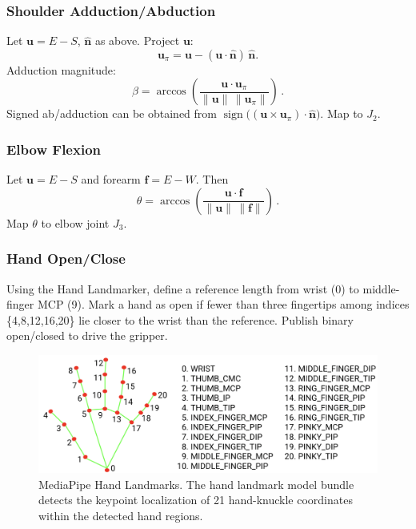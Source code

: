 \documentclass[sigconf]{acmart}
\begin{document}
\subsubsection{Shoulder Adduction/Abduction}
Let $\mathbf{u}=E-S$, $\hat{\mathbf{n}}$ as above. Project $\mathbf{u}$:
\begin{displaymath}
\mathbf{u}_\pi=\mathbf{u}-(\mathbf{u}\cdot\hat{\mathbf{n}})\,\hat{\mathbf{n}}.
\end{displaymath}
Adduction magnitude:
\begin{equation}
\beta=\arccos \!\left( \frac{\mathbf{u}\cdot\mathbf{u}_\pi}{\lVert\mathbf{u}\rVert\, \lVert\mathbf{u}_\pi\rVert} \right)\,.
\end{equation}
Signed ab/adduction can be obtained from $\operatorname{sign}\big((\mathbf{u}\times\mathbf{u}_\pi)\cdot\hat{\mathbf{n}}\big)$. Map to $J_2$.

\subsubsection{Elbow Flexion}
Let $\mathbf{u}=E-S$ and forearm $\mathbf{f}=E-W$. Then
\begin{equation}
\theta=\arccos \!\left( \frac{\mathbf{u}\cdot\mathbf{f}}{\lVert\mathbf{u}\rVert\, \lVert\mathbf{f}\rVert} \right)\,.
\end{equation}
Map $\theta$ to elbow joint $J_3$.

\subsubsection{Hand Open/Close}
Using the Hand Landmarker, define a reference length from wrist (0) to middle-finger MCP (9). Mark a hand as open if fewer than three fingertips among indices \{4,8,12,16,20\} lie closer to the wrist than the reference. Publish binary open/closed to drive the gripper.

\begin{figure}[htbp]
  \centering
  \includegraphics[width=\linewidth]{assets/hand-landmarks.png}
  \caption{MediaPipe Hand Landmarks. The hand landmark model bundle detects the keypoint localization of 21 hand-knuckle coordinates within the detected hand regions.}
  \label{fig:hand-landmarks}
\end{figure}
\end{document}
